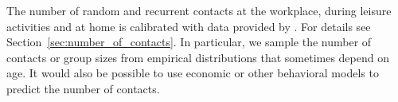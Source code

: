 The number of random and recurrent contacts at the workplace, during leisure activities
and at home is calibrated with data provided by \citet{Mossong2008}. For details see
Section~\ref{sec:number_of_contacts}. In particular, we sample the number of contacts or
group sizes from empirical distributions that sometimes depend on age. It would also be
possible to use economic or other behavioral models to predict the number of contacts.

